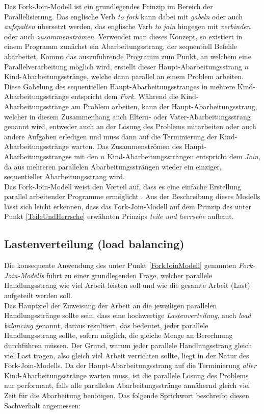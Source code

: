			Das Fork-Join-Modell ist ein grundlegendes Prinzip im Bereich der Parallelisierung.
			Das englische Verb \textit{to fork} kann dabei mit \textit{gabeln} oder auch \textit{aufspalten} übersetzt werden, das englische Verb \textit{to join} hingegen mit \textit{verbinden} oder auch \textit{zusammenströmen}. Verwendet man dieses Konzept, so existiert in einem Programm zunächst ein Abarbeitungsstrang, der sequentiell Befehle abarbeitet. Kommt das auszuführende Programm zum Punkt, an welchem eine Parallelverarbeitung möglich wird, erstellt dieser Haupt-Abarbeitungsstrang $n$ Kind-Abarbeitungsstränge, welche dann parallel an einem Problem arbeiten. Diese Gabelung des sequentiellen Haupt-Abarbeitungsstranges in mehrere Kind-Abarbeitungsstränge entspricht dem \textit{Fork}. Während die Kind-Abarbeitungsstränge am Problem arbeiten, kann der Haupt-Abarbeitungsstrang, welcher in diesem Zusammenhang auch Eltern- oder Vater-Abarbeitungsstrang genannt wird, entweder auch an der Lösung des Problems mitarbeiten oder auch andere Aufgaben erledigen und muss dann auf die Terminierung der Kind-Abarbeitungsstränge warten. Das Zusammenströmen des Haupt-Abarbeitungsstranges mit den $n$ Kind-Abarbeitungssträngen entspricht dem \textit{Join}, da aus mehreren parallelen Abarbeitungssträngen wieder ein einziger, sequentieller Abarbeitungsstrang wird.\\
			Das Fork-Join-Modell weist den Vorteil auf, dass es eine einfache Erstellung parallel arbeitender Programme ermöglicht \cite{ParaProgRauber}. Aus der Beschreibung dieses Modells lässt sich leicht erkennen, dass das Fork-Join-Modell auf dem Prinzip des unter Punkt \ref{TeileUndHerrsche} erwähnten Prinzips \textit{teile und herrsche} aufbaut.

		\subsection{Lastenverteilung (load balancing)}
		
			Die konsequente Anwendung des unter Punkt \ref{ForkJoinModell} genannten \textit{Fork-Join-Modells} führt zu einer grundlegenden Frage, welcher parallele Handlungsstrang wie viel Arbeit leisten soll und wie die gesamte Arbeit (Last) aufgeteilt werden soll.\\
			Das Hauptziel der Zuweisung der Arbeit an die jeweiligen parallelen Handlungsstränge sollte sein, dass eine hochwertige \textit{Lastenverteilung}, auch \textit{load balancing} genannt, daraus resultiert, das bedeutet, jeder parallele Handlungsstrang sollte, sofern möglich, die gleiche Menge an Berechnung durchführen müssen. \cite{ParaProgRauber}
			Der Grund, warum jeder parallele Handlungsstrang gleich viel Last tragen, also gleich viel Arbeit verrichten sollte, liegt in der Natur des Fork-Join-Modells. Da der Haupt-Abarbeitungsstrang auf die Terminierung \textit{aller} Kind-Abarbeitungsstränge warten muss, ist die parallele Lösung des Problems nur performant, falls alle parallelen Abarbeitungsstränge annähernd gleich viel Zeit für die Abarbeitung benötigen. Das folgende Sprichwort beschreibt diesen Sachverhalt angemessen:
			
